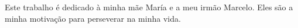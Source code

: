 Este trabalho é dedicado à minha mãe María e a meu irmão Marcelo.
Eles são a minha motivação para perseverar na minha vida.
